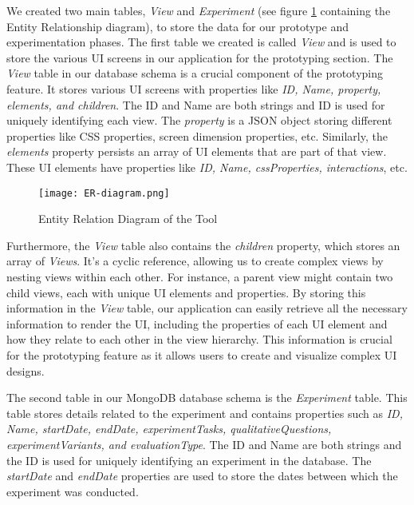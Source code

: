 We created two main tables, \textit{View} and \textit{Experiment} (see figure \ref{implementation:fig:erdb} containing the Entity Relationship diagram), to store the data for our prototype and experimentation phases. 
The first table we created is called \textit{View} and is used to store the various UI screens in our application for the prototyping section. 
The \textit{View} table in our database schema is a crucial component of the prototyping feature. 
It stores various UI screens with properties like \textit{ID, Name, property, elements, and children}. 
The ID and Name are both strings and ID is used for uniquely identifying each view. 
The \textit{property} is a JSON object storing different properties like CSS properties, screen dimension properties, etc. 
Similarly, the \textit{elements} property persists an array of UI elements that are part of that view. 
These UI elements have properties like \textit{ID, Name, cssProperties, interactions}, etc.

\begin{figure}[ht]
    \centering
    \texttt{[image: ER-diagram.png]}
    \caption[ER Diagram]{Entity Relation Diagram of the Tool}
    \label{implementation:fig:erdb}
\end{figure}

Furthermore, the \textit{View} table also contains the \textit{children} property, which stores an array of \textit{Views}. 
It's a cyclic reference, allowing us to create complex views by nesting views within each other. 
For instance, a parent view might contain two child views, each with unique UI elements and properties.
By storing this information in the \textit{View} table, our application can easily retrieve all the necessary information to render the UI, including the properties of each UI element and how they relate to each other in the view hierarchy. 
This information is crucial for the prototyping feature as it allows users to create and visualize complex UI designs.

The second table in our MongoDB database schema is the \textit{Experiment} table. 
This table stores details related to the experiment and contains properties such as \textit{ID, Name, startDate, endDate, experimentTasks, qualitativeQuestions, experimentVariants, and evaluationType}.
The ID and Name are both strings and the ID is used for uniquely identifying an experiment in the database. 
The \textit{startDate} and \textit{endDate} properties are used to store the dates between which the experiment was conducted.

